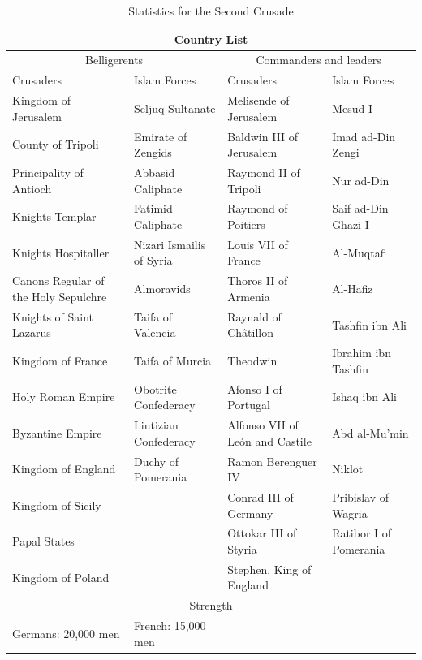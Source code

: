 \documentclass[11pt]{book}
\begin{document}
\begin{table}
\begin{center}
\caption{Statistics for the Second Crusade}
\label{tab:statsSecondCrusade}


\begin{tabular}{ |p{3cm}|p{3cm}|p{3cm}|p{3cm}|  }
 \hline
 \multicolumn{4}{|c|}{Country List} \\
 \hline
 \multicolumn{2}{|c|}{Belligerents} & \multicolumn{2}{c|}{Commanders and leaders}\\
 \hline
 Crusaders & Islam Forces & Crusaders & Islam Forces \\
 \hline
 Kingdom of Jerusalem&Seljuq Sultanate&Melisende of Jerusalem&Mesud I\\
 County of Tripoli&Emirate of Zengids& Baldwin III of Jerusalem& Imad ad-Din Zengi\\
 Principality of Antioch&Abbasid Caliphate&Raymond II of Tripoli&Nur ad-Din\\
 Knights Templar &Fatimid Caliphate&Raymond of Poitiers&Saif ad-Din Ghazi I\\
 Knights Hospitaller&Nizari Ismailis of Syria &Louis VII of France&Al-Muqtafi\\
 Canons Regular of the Holy Sepulchre&Almoravids&Thoros II of Armenia&Al-Hafiz\\
  Knights of Saint Lazarus&Taifa of Valencia&Raynald of Châtillon&Tashfin ibn Ali\\
   Kingdom of France&Taifa of Murcia&Theodwin&Ibrahim ibn Tashfin \\
    Holy Roman Empire&Obotrite Confederacy&Afonso I of Portugal&Ishaq ibn Ali\\
    Byzantine Empire&Liutizian Confederacy&Alfonso VII of León and Castile&Abd al-Mu'min\\
    Kingdom of England&Duchy of Pomerania&Ramon Berenguer IV&Niklot\\
    Kingdom of Sicily& &Conrad III of Germany&Pribislav of Wagria\\
    Papal States&  &Ottokar III of Styria&Ratibor I of Pomerania\\
    Kingdom of Poland&  &Stephen, King of England&\\
 \hline
 \multicolumn{4}{|c|}{Strength} \\
 \hline
 Germans: 20,000 men & French: 15,000 men & \multicolumn{2}{c|}{}\\
 \hline
\end{tabular}


\end{center}
\end{table}
\end{document}
